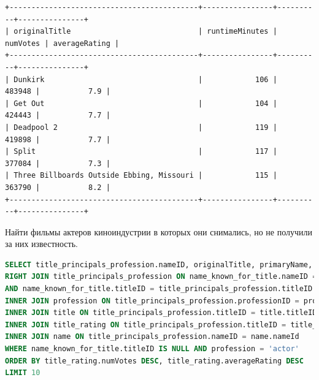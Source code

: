 \documentclass[12pt,a4paper]{article}
\begin{document}
\begin{lstlisting}[basicstyle = \tiny\ttfamily, columns = fixed]
+-------------------------------------------+----------------+----------+---------------+
| originalTitle                             | runtimeMinutes | numVotes | averageRating |
+-------------------------------------------+----------------+----------+---------------+
| Dunkirk                                   |            106 |   483948 |           7.9 |
| Get Out                                   |            104 |   424443 |           7.7 |
| Deadpool 2                                |            119 |   419898 |           7.7 |
| Split                                     |            117 |   377084 |           7.3 |
| Three Billboards Outside Ebbing, Missouri |            115 |   363790 |           8.2 |
+-------------------------------------------+----------------+----------+---------------+
\end{lstlisting}

Найти фильмы актеров киноиндустрии в которых они снимались, но не получили за них известность.

\begin{lstlisting}[language=SQL]
SELECT title_principals_profession.nameID, originalTitle, primaryName, characters FROM name_known_for_title
RIGHT JOIN title_principals_profession ON name_known_for_title.nameID = title_principals_profession.nameID 
AND name_known_for_title.titleID = title_principals_profession.titleID
INNER JOIN profession ON title_principals_profession.professionID = profession.professionID
INNER JOIN title ON title_principals_profession.titleID = title.titleID
INNER JOIN title_rating ON title_principals_profession.titleID = title_rating.titleID
INNER JOIN name ON title_principals_profession.nameID = name.nameId
WHERE name_known_for_title.titleID IS NULL AND profession = 'actor'
ORDER BY title_rating.numVotes DESC, title_rating.averageRating DESC
LIMIT 10
\end{lstlisting}
\end{document}
